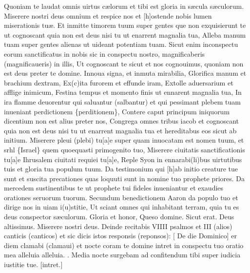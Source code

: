 \documentclass[letter,12pt]{book}
\makeatletter
\newcommand*\zallmancaps{\usefont{U}{Zallman}{xl}{n}}
\DeclareRobustCommand{\Vbar}{\vers@resp{-0.1em}{V}}
\DeclareRobustCommand{\Rbar}{\vers@resp{0pt}{R}}
\newcommand{\vers@resp@sym}{\raisebox{0.2ex}{\rotatebox[origin=c]{-20}{$\m@th\rceil$}}}
\newcommand{\vers@resp}[2]{%
  {\ooalign{\hidewidth\kern#1\vers@resp@sym\hidewidth\cr#2\cr}}%
}%
\def\V{\color{Red} \Vbar . \color{black}}
\def\R{\color{Red} \Rbar . \color{black}}
\makeatother
\begin{document}
{\color{Red} Q}uoniam te laudat omnis uirtus c\ae lorum et tibi est gloria in s\ae cula s\ae culorum.
\lettrine[lines=3]{\color{Red} \zallmancaps M}{}iserere nostri deus omnium et respice nos et [h]ostende nobis lumen miserationis tu\ae .
{\color{Red} E}t inmitte timorem tuum super gentes que non exquisierunt te ut cognoscant quia non est deus nisi tu ut enarrent magnalia tua,
{\color{Red} A}lleba manum tuam super gentes alienas ut uideant potentiam tuam.
{\color{Red} S}icut enim inconspectu eorum
sanctificatus in nobis sic in conspectu nostro, magnificaberis (magnificaueris) in illis,
{\color{Red} U}t cognoscant te sicut et nos cognouimus, quoniam non est deus preter te domine.
{\color{Red} I}nnoua signa, et inmuta mirabilia,
{\color{Red} G}lorifica manum et brachium dextram,
{\color{Red} E}x(c)ita furorem et effunde iram,
{\color{Red} E}xtolle aduersarium et afflige inimicum,
{\color{Red} F}estina tempus et momento finis ut ennarent magnalia tua,
{\color{Red} I}n ira flamme deuorentur qui saluantur (salbantur) et qui pessimant plebem tuam inueniant perdictionem \{perditionem\},
{\color{Red} C}ontere caput principum iniquorum dicentium non est alius preter nos,
{\color{Red} C}ongrega omnes tribus iacob et cognoscant quia non est deus nisi tu ut enarrent magnalia tua et hereditabus eos sicut ab initium.
{\color{Red} M}iserere pleui (plebi) tu[a]e super quam inuocatam est nomen tuum, et srhl \{Israel\} quem quoequasti primogenito tuo,
{\color{Red} M}iserere ciuitatis sanctificationis tu[a]e Ihrusalem ciuitati requiei tu[a]e,
{\color{Red} R}eple Syon in ennarabi(li)bus uirtutibus tuis et gloria tua populum tuum.
{\color{Red} D}a testimonium qui [h]ab initio creature tue sunt et suscita %
precationes quas loquuti sunt in nomine tuo prophete priores.
{\color{Red} D}a mercedem sustinentibus te ut prophete tui fideles inueniantur et exaudies orationes seruorum tuorum.
{\color{Red} S}ecundum benedictionem Aaron da populo tuo et dirige nos in uiam i(u)stitie,
{\color{Red} U}t sciant omnes qui inhabitant terram, quia tu es deus conspector s\ae culorum.
{\color{Red} G}loria et honor, {\color{Red} Q}ueso domine. {\color{Red} S}icut erat. {\color{Red} D}eus altissimus. {\color{Red} M}iserere nostri deus. {\color{Red} D}einde recitabis VIIII psalmos et III (alios) canticis (canticos) et sic dicis istos responsis (reponsos): [{\color{Red} De die Dominico}]
\newline {\R \color{Red} P}er diem clamabi (clamaui) et nocte coram te domine intret in conspectu tuo oratio mea alleluia alleluia. \V Media nocte surgebam ad confitendum tibi super iudicia iustitie tue. [intret.]
\end{document}
